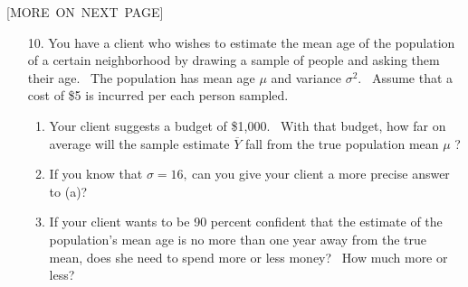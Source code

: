 \documentclass[11pt]{article}
\begin{document}
\begin{center}
[MORE\ ON\ NEXT\ PAGE]
\end{center}

\begin{enumerate}
\item[10.] You have a client who wishes to estimate the mean age of the
population of a certain neighborhood by drawing a sample of people and
asking them their age. \ The population has mean age $\mu $ and variance $%
\sigma ^{2}.$ \ Assume that a cost of \$5 is incurred per each person
sampled.

\begin{enumerate}
\item Your client suggests a budget of \$1,000. \ With that budget, how far
on average will the sample estimate $\overline{Y}$ fall from the true
population mean $\mu $ ?

\item If you know that $\sigma =16,\ $can you give your client a more
precise answer to (a)?

\item If your client wants to be 90 percent confident that the estimate of
the population's mean age is no more than one year away from the true mean,
does she need to spend more or less money? \ How much more or less?
\end{enumerate}
\end{enumerate}
\end{document}

